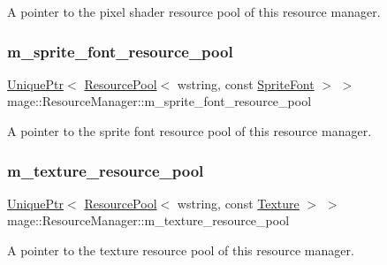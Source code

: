 A pointer to the pixel shader resource pool of this resource manager. \hypertarget{classmage_1_1_resource_manager_a4447daa4489cfe3d06629799f829915f}{}\label{classmage_1_1_resource_manager_a4447daa4489cfe3d06629799f829915f} 
\subsubsection{\texorpdfstring{m\+\_\+sprite\+\_\+font\+\_\+resource\+\_\+pool}{m\_sprite\_font\_resource\_pool}}
{\footnotesize\ttfamily \hyperlink{namespacemage_a3316d7143a973e37adf1110f2e80ca31}{Unique\+Ptr}$<$ \hyperlink{classmage_1_1_resource_pool}{Resource\+Pool}$<$ wstring, const \hyperlink{classmage_1_1_sprite_font}{Sprite\+Font} $>$ $>$ mage\+::\+Resource\+Manager\+::m\+\_\+sprite\+\_\+font\+\_\+resource\+\_\+pool\hspace{0.3cm}{\ttfamily [private]}}

A pointer to the sprite font resource pool of this resource manager. \hypertarget{classmage_1_1_resource_manager_a267774ad90f546e73a9415e6baa37d2a}{}\label{classmage_1_1_resource_manager_a267774ad90f546e73a9415e6baa37d2a} 
\subsubsection{\texorpdfstring{m\+\_\+texture\+\_\+resource\+\_\+pool}{m\_texture\_resource\_pool}}
{\footnotesize\ttfamily \hyperlink{namespacemage_a3316d7143a973e37adf1110f2e80ca31}{Unique\+Ptr}$<$ \hyperlink{classmage_1_1_resource_pool}{Resource\+Pool}$<$ wstring, const \hyperlink{classmage_1_1_texture}{Texture} $>$ $>$ mage\+::\+Resource\+Manager\+::m\+\_\+texture\+\_\+resource\+\_\+pool\hspace{0.3cm}{\ttfamily [private]}}

A pointer to the texture resource pool of this resource manager. \hypertarget{classmage_1_1_resource_manager_adc36ebb3e2d04fddc3a23e2f1303dbfe}{}\label{classmage_1_1_resource_manager_adc36ebb3e2d04fddc3a23e2f1303dbfe} 
